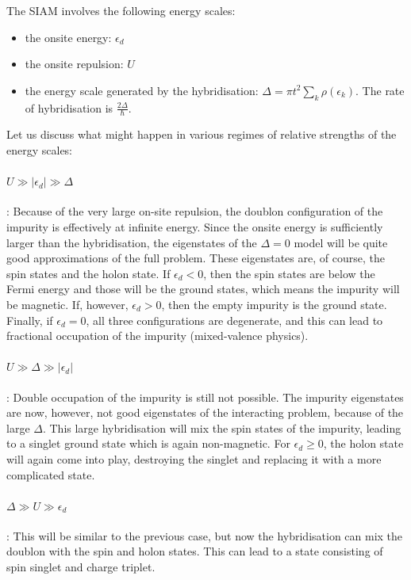 The SIAM involves the following energy scales:
\begin{itemize}
	\item the onsite energy: \(\epsilon_d\)
	\item the onsite repulsion: \(U\)
	\item the energy scale generated by the hybridisation: \(\Delta = \pi t^2\sum_k \rho(\epsilon_k)\). The rate of hybridisation is \(\frac{2\Delta}{\hbar}\).
\end{itemize}
Let us discuss what might happen in various regimes of relative strengths of the energy scales:
\paragraph{\(U \gg |\epsilon_d| \gg \Delta\)} : Because of the very large on-site repulsion, the doublon configuration of the impurity is effectively at infinite energy. Since the onsite energy is sufficiently larger than the hybridisation, the eigenstates of the \(\Delta = 0\) model will be quite good approximations of the full problem. These eigenstates are, of course, the spin states and the holon state. If \(\epsilon_d < 0\), then the spin states are below the Fermi energy and those will be the ground states, which means the impurity will be magnetic. If, however, \(\epsilon_d > 0\), then the empty impurity is the ground state. Finally, if \(\epsilon_d = 0\), all three configurations are degenerate, and this can lead to fractional occupation of the impurity (mixed-valence physics).
\paragraph*{\(U \gg \Delta\gg |\epsilon_d| \)}: Double occupation of the impurity is still not possible. The impurity eigenstates are now, however, not good eigenstates of the interacting problem, because of the large \(\Delta\). This large hybridisation will mix the spin states of the impurity, leading to a singlet ground state which is again non-magnetic. For \(\epsilon_d \geq 0\), the holon state will again come into play, destroying the singlet and replacing it with a more complicated state.
\paragraph*{\(\Delta\gg U \gg \epsilon_d\)}: This will be similar to the previous case, but now the hybridisation can mix the doublon with the spin and holon states. This can lead to a state consisting of spin singlet and charge triplet.

